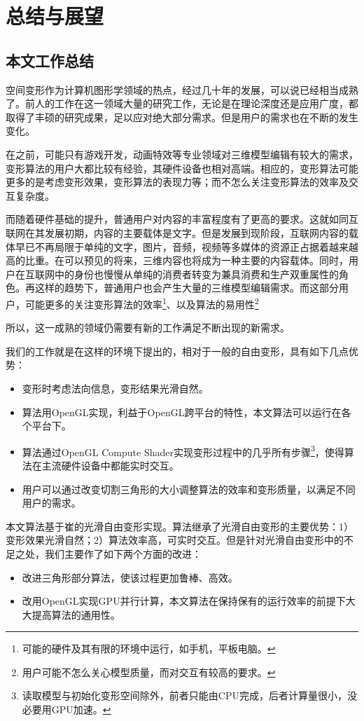 \chapter{总结与展望}
\section{本文工作总结}
    空间变形作为计算机图形学领域的热点，经过几十年的发展，可以说已经相当成熟了。前人的工作在这一领域大量的研究工作，无论是在理论深度还是应用广度，都取得了丰硕的研究成果，足以应对绝大部分需求。但是用户的需求也在不断的发生变化。

    在之前，可能只有游戏开发，动画特效等专业领域对三维模型编辑有较大的需求，变形算法的用户大都比较有经验，其硬件设备也相对高端。相应的，变形算法可能更多的是考虑变形效果，变形算法的表现力等；而不怎么关注变形算法的效率及交互复杂度。

    而随着硬件基础的提升，普通用户对内容的丰富程度有了更高的要求。这就如同互联网在其发展初期，内容的主要载体是文字。但是发展到现阶段，互联网内容的载体早已不再局限于单纯的文字，图片，音频，视频等多媒体的资源正占据着越来越高的比重。在可以预见的将来，三维内容也将成为一种主要的内容载体。同时，用户在互联网中的身份也慢慢从单纯的消费者转变为兼具消费和生产双重属性的角色。再这样的趋势下，普通用户也会产生大量的三维模型编辑需求。而这部分用户，可能更多的关注变形算法的效率\footnote{可能的硬件及其有限的环境中运行，如手机，平板电脑。}、以及算法的易用性\footnote{用户可能不怎么关心模型质量，而对交互有较高的要求。}

    所以，这一成熟的领域仍需要有新的工作满足不断出现的新需求。

    我们的工作就是在这样的环境下提出的，相对于一般的自由变形，具有如下几点优势：
    \begin{itemize}
        \item 变形时考虑法向信息，变形结果光滑自然。
        \item 算法用OpenGL实现，利益于OpenGL跨平台的特性，本文算法可以运行在各个平台下。
        \item 算法通过OpenGL Compute Shader实现变形过程中的几乎所有步骤\footnote{读取模型与初始化变形空间除外，前者只能由CPU完成，后者计算量很小，没必要用GPU加速。}，使得算法在主流硬件设备中都能实时交互。
        \item 用户可以通过改变切割三角形的大小调整算法的效率和变形质量，以满足不同用户的需求。
    \end{itemize}

    本文算法基于崔的光滑自由变形\cite{Cui15}实现。算法继承了光滑自由变形的主要优势：1）变形效果光滑自然；2）算法效率高，可实时交互。但是针对光滑自由变形中的不足之处，我们主要作了如下两个方面的改进：
    \begin{itemize}
        \item 改进三角形部分算法，使该过程更加鲁棒、高效。
        \item 改用OpenGL实现GPU并行计算，本文算法在保持保有的运行效率的前提下大大提高算法的通用性。
    \end{itemize}

